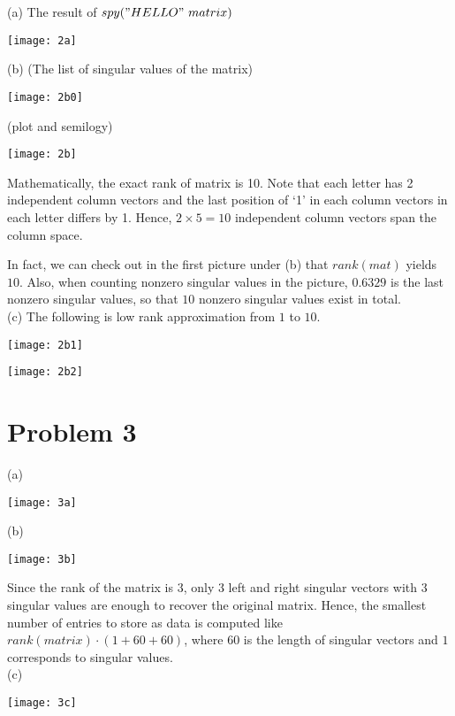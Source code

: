 \documentclass[11pt]{article} %
\theoremstyle{definition}
\begin{document}
(a) The result of $spy("HELLO"\ matrix)$
\begin{center} 
\texttt{[image: 2a]}
\end{center}

(b)
(The list of singular values of the matrix)
\begin{center}
\texttt{[image: 2b0]}
\end{center}

(plot and semilogy)
\begin{center}
\texttt{[image: 2b]}
\end{center}
\newpage

Mathematically, the exact rank of matrix is 10. Note that each letter has 2 independent column vectors and the last position of `1' in each column vectors in each letter differs by 1. Hence, $2\times 5 = 10$ independent column vectors span the column space.

In fact, we can check out in the first picture under (b) that $rank(mat)$ yields $10$. Also, when counting nonzero singular values in the picture, $0.6329$ is the last nonzero singular values, so that $10$ nonzero singular values exist in total. 
\\

(c) The following is low rank approximation from $1$ to $10$.
\begin{center}
\texttt{[image: 2b1]}
\end{center}
\begin{center}
\texttt{[image: 2b2]}
\end{center}

\section*{Problem 3}


(a)
\begin{center}
\texttt{[image: 3a]}
\end{center}

(b)
\begin{center}
\texttt{[image: 3b]}
\end{center}
Since the rank of the matrix is $3$, only 3 left and right singular vectors with 3 singular values are enough to recover the original matrix. Hence, the smallest number of entries to store as data is computed like $rank(matrix)\cdot (1 + 60 + 60)$, where $60$ is the length of singular vectors and $1$ corresponds to singular values.\\
\newpage
(c)
\begin{center}
\texttt{[image: 3c]}
\end{center}
\end{document}
